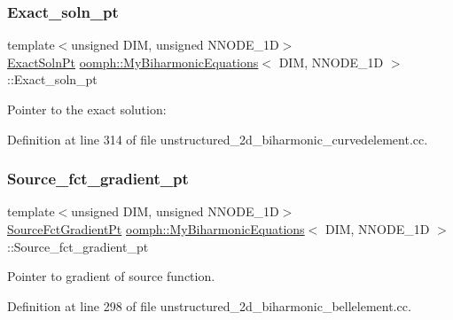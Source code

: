 \subsubsection{\texorpdfstring{Exact\+\_\+soln\+\_\+pt}{Exact\_soln\_pt}}
{\footnotesize\ttfamily template$<$unsigned D\+IM, unsigned N\+N\+O\+D\+E\+\_\+1D$>$ \\
\hyperlink{classoomph_1_1MyBiharmonicEquations_a20238fec79ab67b90f3be58ea498e681}{Exact\+Soln\+Pt} \hyperlink{classoomph_1_1MyBiharmonicEquations}{oomph\+::\+My\+Biharmonic\+Equations}$<$ D\+IM, N\+N\+O\+D\+E\+\_\+1D $>$\+::Exact\+\_\+soln\+\_\+pt\hspace{0.3cm}{\ttfamily [protected]}}



Pointer to the exact solution\+: 



Definition at line 314 of file unstructured\+\_\+2d\+\_\+biharmonic\+\_\+curvedelement.\+cc.

\mbox{\label{classoomph_1_1MyBiharmonicEquations_afbd71d4a6c31f36d88bf60697c4140aa}} 
\subsubsection{\texorpdfstring{Source\+\_\+fct\+\_\+gradient\+\_\+pt}{Source\_fct\_gradient\_pt}}
{\footnotesize\ttfamily template$<$unsigned D\+IM, unsigned N\+N\+O\+D\+E\+\_\+1D$>$ \\
\hyperlink{classoomph_1_1MyBiharmonicEquations_af007c03701e888fed7375cb4537f0046}{Source\+Fct\+Gradient\+Pt} \hyperlink{classoomph_1_1MyBiharmonicEquations}{oomph\+::\+My\+Biharmonic\+Equations}$<$ D\+IM, N\+N\+O\+D\+E\+\_\+1D $>$\+::Source\+\_\+fct\+\_\+gradient\+\_\+pt\hspace{0.3cm}{\ttfamily [protected]}}



Pointer to gradient of source function. 



Definition at line 298 of file unstructured\+\_\+2d\+\_\+biharmonic\+\_\+bellelement.\+cc.

\mbox{\label{classoomph_1_1MyBiharmonicEquations_aa96fd779e04f5c726f2535f43210e905}} 
